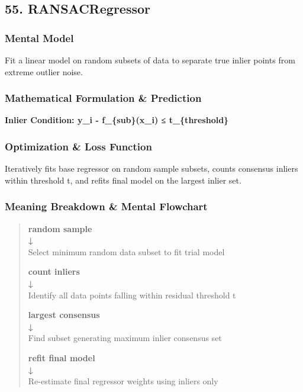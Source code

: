 \documentclass[
  10pt,
  letterpaper,
]{article}
\begin{document}
\hypertarget{ransacregressor}{%
\subsection{55. RANSACRegressor}\label{ransacregressor}}

\hypertarget{mental-model-54}{%
\subsubsection{Mental Model}\label{mental-model-54}}

Fit a linear model on random subsets of data to separate true inlier points from extreme outlier noise.

\hypertarget{mathematical-formulation-prediction-54}{%
\subsubsection{Mathematical Formulation \& Prediction}\label{mathematical-formulation-prediction-54}}

\textbf{Inlier Condition: \textbar y\_i - f\_\{sub\}(x\_i)\textbar{} ≤ t\_\{threshold\}}

\hypertarget{optimization-loss-function-54}{%
\subsubsection{Optimization \& Loss Function}\label{optimization-loss-function-54}}

Iteratively fits base regressor on random sample subsets, counts consensus inliers within threshold t, and refits final model on the largest inlier set.

\hypertarget{meaning-breakdown-mental-flowchart-54}{%
\subsubsection{Meaning Breakdown \& Mental Flowchart}\label{meaning-breakdown-mental-flowchart-54}}

\begin{quote}
\textbf{random sample\\
↓\\
}Select minimum random data subset to fit trial model

\textbf{count inliers\\
↓\\
}Identify all data points falling within residual threshold t

\textbf{largest consensus\\
↓\\
}Find subset generating maximum inlier consensus set

\textbf{refit final model\\
↓\\
}Re-estimate final regressor weights using inliers only
\end{quote}
\end{document}
